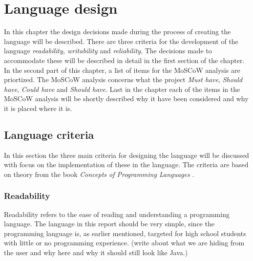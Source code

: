 \chapter{Language design}
\label{chap:LanguageDesign}
In this chapter the design decisions made during the process of creating the language will be described. There are three criteria for the development of the language \emph{readability, writability} and \emph{reliability}. The decisions made to accommodate these will be described in detail in the first section of the chapter. In the second part of this chapter, a list of items for the MoSCoW analysis are priortized. The MoSCoW analysis concerns what the project \textit{Must have}, \textit{Should have}, \textit{Could have} and \textit{Should have}. Last in the chapter each of the  items in the MoSCoW analysis will be shortly described why it have been considered and why it is placed where it is.
 
\section{Language criteria}

In this section the three main criteria for designing the language will be discussed with focus on the implementation of these in the language. The criteria are based on theory from the book \emph{Concepts of Programming Languages} \citep{Sebesta}.

\subsection{Readability}
Readability refers to the ease of reading and understanding a programming language. The language in this report should be very simple, since the programming language is, as earlier mentioned, targeted for high school students with little or no programming experience. (write about what we are hiding from  the user and why here and why it should still look like Java.)
\label{sec:MoSCoW}

